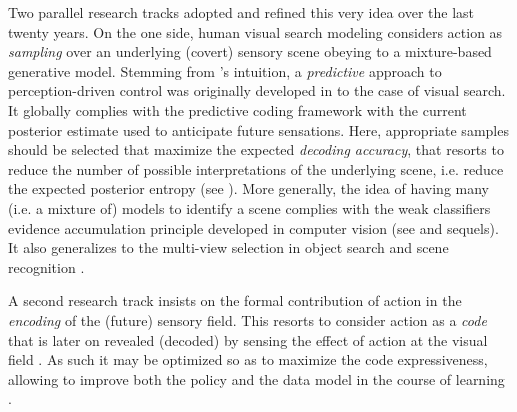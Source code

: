 \documentclass[12pt,twoside,openright]{article}
\begin{document}
Two parallel research tracks adopted and refined this very idea over the last twenty years.
On the one side, human visual search modeling considers action as  \emph{sampling} over an underlying (covert) sensory scene obeying to a mixture-based generative model. 
Stemming from \cite{bajcsy1988active}'s intuition, a \emph{predictive} approach to perception-driven control was originally developed in \cite{najemnik2005optimal} to the case of visual search.
It globally complies with the predictive coding framework \cite{rao1999predictive} with the current posterior estimate used to anticipate future sensations. 
Here, appropriate samples should be selected that maximize the expected \emph{decoding accuracy}, that resorts to reduce the number of possible interpretations of the underlying scene, i.e. reduce the expected posterior entropy (see \cite{najemnik2005optimal,najemnik2009simple,butko2010infomax,friston2012perceptions}).
More generally, the idea of having many (i.e. a mixture of) models to identify a scene complies with the weak classifiers evidence accumulation principle developed in computer vision (see \cite{viola2003fast} and sequels). It also generalizes to the multi-view selection in object search and scene recognition \cite{potthast2016active}.

A second research track insists on the formal contribution of action in the \emph{encoding} of the (future) sensory field. This resorts to consider action as a \emph{code} that is later on revealed (decoded) by sensing the effect of action at the visual field \cite{klyubin2005empowerment,tishby2011information}. As such it may be optimized so as to maximize the code expressiveness, allowing to improve both the policy and the data model in the course of learning \cite{schmidhuber2007simple,mohamed2015variational,houthooft2016vime}.
\end{document}
